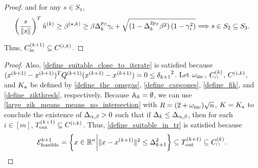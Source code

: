 \begin{proof}
and for any $s\in S_1$,
\begin{align*}
\left(\frac{s}{\|s\|}\right)^T{{\hat u}^{(k)}} \ge {\beta^{(\star, k)}} 
\ge \beta\Delta_k^{p_{\beta}}\gamma_i + \sqrt{(1 - \Delta_k^{2p_{\beta}}\beta^2)\left(1 - \gamma_i^2\right)}
\Longrightarrow s \in S_2 \subseteq S_3.
\end{align*}

Thus, ${C^{(k+1)}_{\textrm{in}}} \subseteq {C^{(i, k)}}$.
\end{proof}




\begin{proof}

Also, \cref{define_suitable_close_to_iterate} is satisfied because $({{x}^{(k+1)}} - {{x}^{(k+1)}})^T{Q^{(k+1)}}({{x}^{(k+1)}} - {{x}^{(k+1)}}) = 0 \le {\delta_{k+1}}^2$.
Let $\omega_{\text{inc}}$, ${C^{(k)}_{\cap}}$, ${C^{(i, k)}}$, and ${ K_{\textrm{a}} }$ be defined by \cref{define_the_omegas}, \cref{define_capcones}, \cref{define_fik}, and \cref{define_zikthresh}, respectively.
Because ${\mathbb A_{k}} = \emptyset$, we can use 
\cref{large_zik_means_means_no_intersection} with $R = (2 + \omega_{\text{inc}})\sqrt{n}$, $K = { K_{\textrm{a}} }$ to conclude the existence of ${\Delta_{\alpha,\beta}} > 0$ such that 
if $\Delta_k \le {\Delta_{\alpha,\beta}}$, then for each 
$i \in [m]$, ${T_{\text{out}}^{(k+1)}} \subseteq {C^{(i, k)}}$.
Thus, \cref{define_suitable_in_tr} is satisfied because 
\begin{align*}
{\mathcal E^{k+1}_{\textrm{feasible}}} = \left\{x \in \mathbb R^n \bigg| \|x - {{x}^{(k+1)}}\|^2 \le \Delta_{k+1}^2 \right\} \subseteq {T_{\text{out}}^{(k+1)}} \subseteq {C^{(k)}_{\cap}}.
\end{align*}
\end{proof}


